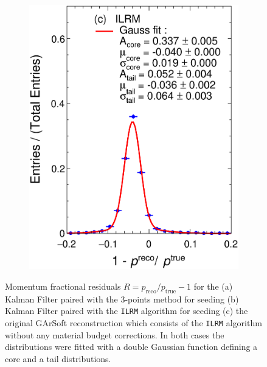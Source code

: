 \begin{figure}[t]
\begin{subfigure}{0.32\textwidth}
         \includegraphics[width=\textwidth]{figures/ch4-KF_NDGArLite/MC/ILRM+KF/pResILRM_doublegauss.eps}
         \caption{}
         \label{fig:respKF_GArLite_ILRM}
     \end{subfigure}
        \caption{Momentum fractional residuals $R=p_{\text{reco}}/p_{\text{true}} - 1$ for the (a) Kalman Filter paired with the 3-points method for seeding (b) Kalman Filter paired with the \texttt{ILRM} algorithm for seeding (c) the original GArSoft reconstruction which consists of the \texttt{ILRM} algorithm without any material budget corrections. In both cases the distributions were fitted with a double Gaussian function defining a core and a tail distributions.} 
        \label{fig:MCpResComparison}
\end{figure}

